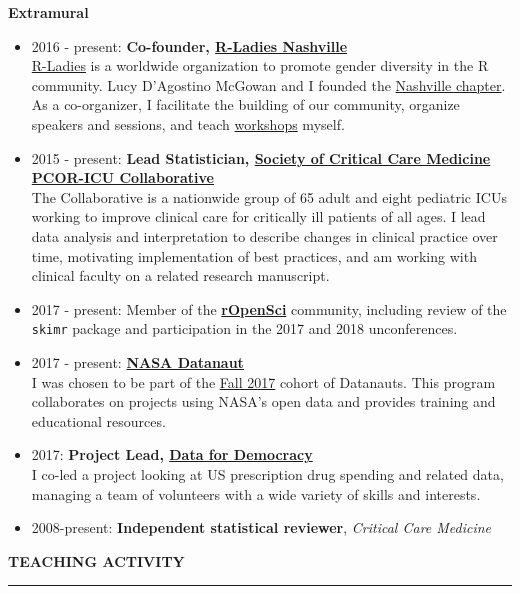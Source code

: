 \documentclass[5pt]{article}
\begin{document}
\noindent \textbf{Extramural}
\begin{itemize}
\item 2016 - present: \textbf{Co-founder, \href{https://www.meetup.com/rladies-nashville}{R-Ladies Nashville}}\\
\indent \href{http://www.rladies.org}{R-Ladies} is a worldwide organization to promote gender diversity in the R community. Lucy D'Agostino McGowan and I founded the \href{https://www.meetup.com/rladies-nashville}{Nashville chapter}.  As a co-organizer, I facilitate the building of our community, organize speakers and sessions, and teach \href{github.com/jenniferthompson/RLadiesIntroToPurrr}{workshops} myself.
\item 2015 - present: \textbf{Lead Statistician, \href{http://www.sccm.org/Research/Quality/Pages/PCOR.aspx}{Society of Critical Care Medicine PCOR-ICU Collaborative}}\\
\indent The Collaborative is a nationwide group of 65 adult and eight pediatric ICUs working to improve clinical care for critically ill patients of all ages. I lead data analysis and interpretation to describe changes in clinical practice over time, motivating implementation of best practices, and am working with clinical faculty on a related research manuscript.
\item 2017 - present: Member of the  \textbf{\href{https://ropensci.org}{rOpenSci}} community, including review of the \texttt{skimr} package and participation in the 2017 and 2018 unconferences.
\item 2017 - present: \textbf{\href{https://open.nasa.gov/explore/datanauts/}{NASA Datanaut}}\\
\indent I was chosen to be part of the \href{https://open.nasa.gov/explore/datanauts/2017/fall/}{Fall 2017} cohort of Datanauts. This program collaborates on projects using NASA's open data and provides training and educational resources.
\item 2017: \textbf{Project Lead, \href{http://datafordemocracy.org}{Data for Democracy}}\\ I co-led a project looking at US prescription drug spending and related data, managing a team of volunteers with a wide variety of skills and interests.
\item 2008-present: \textbf{Independent statistical reviewer}, \emph{Critical Care Medicine}
\end{itemize}

\clearpage
\noindent \linebreak \textbf{TEACHING ACTIVITY}\\
\rule[5pt]{\linewidth}{1.0pt}
\end{document}
